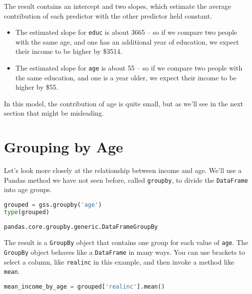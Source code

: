 The result contains an intercept and two slopes, which estimate the
average contribution of each predictor with the other predictor held
constant.

\begin{itemize}
\item
  The estimated slope for \passthrough{\lstinline!educ!} is about 3665
  -- so if we compare two people with the same age, and one has an
  additional year of education, we expect their income to be higher by
  \$3514.
\item
  The estimated slope for \passthrough{\lstinline!age!} is about 55 --
  so if we compare two people with the same education, and one is a year
  older, we expect their income to be higher by \$55.
\end{itemize}

In this model, the contribution of age is quite small, but as we'll see
in the next section that might be misleading.

\section{Grouping by Age}\label{grouping-by-age}

Let's look more closely at the relationship between income and age.
We'll use a Pandas method we have not seen before, called
\passthrough{\lstinline!groupby!}, to divide the
\passthrough{\lstinline!DataFrame!} into age groups.

\begin{lstlisting}[language=Python,style=source]
grouped = gss.groupby('age')
type(grouped)
\end{lstlisting}

\begin{lstlisting}[style=output]
pandas.core.groupby.generic.DataFrameGroupBy
\end{lstlisting}

The result is a \passthrough{\lstinline!GroupBy!} object that contains
one group for each value of \passthrough{\lstinline!age!}. The
\passthrough{\lstinline!GroupBy!} object behaves like a
\passthrough{\lstinline!DataFrame!} in many ways. You can use brackets
to select a column, like \passthrough{\lstinline!realinc!} in this
example, and then invoke a method like \passthrough{\lstinline!mean!}.

\begin{lstlisting}[language=Python,style=source]
mean_income_by_age = grouped['realinc'].mean()
\end{lstlisting}

